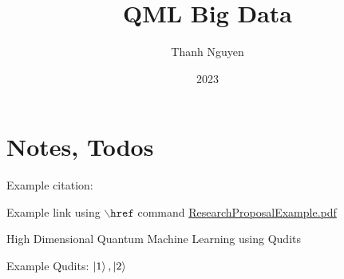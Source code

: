 \documentclass[oneside,notitlepage,12pt,reqno]{article}
\begin{document}
\title{QML Big Data}
\author{Thanh Nguyen}
\date{2023}

\maketitle


\begingroup
\tableofcontents
\endgroup

\section{Notes, Todos}

Example citation: \cite{2020QiskitGlobal}

Example link using $\backslash\texttt{href}$ command
\href{https://static.studyin-uk.com/assets/documents/ResearchProposalExample.pdf}{ResearchProposalExample.pdf}
\begin{framed}
    High Dimensional Quantum Machine Learning using Qudits
\end{framed}
Example Qudits: $\left\vert{1}\right\rangle, \left\vert{2}\right\rangle$







\end{document}
